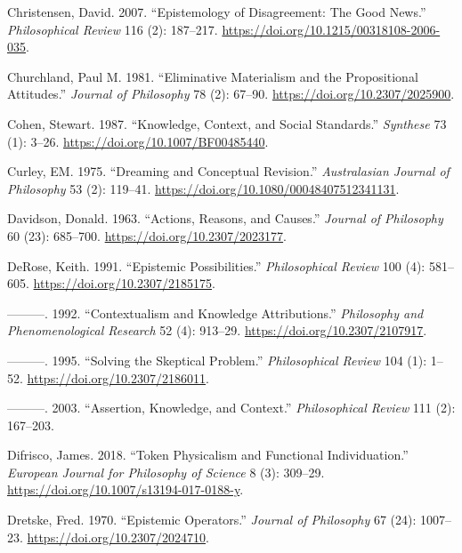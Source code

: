\documentclass[
  12pt,
  letterpaper,
  DIV=11,
  numbers=noendperiod]{scrartcl}
\newlength{\cslhangindent}
\newenvironment{CSLReferences}[2] %
 {\begin{list}{}{%
  \setlength{\itemindent}{0pt}
  \setlength{\leftmargin}{0pt}
  \setlength{\parsep}{0pt}
  \ifodd #1
   \setlength{\leftmargin}{\cslhangindent}
   \setlength{\itemindent}{-1\cslhangindent}
  \fi
  \setlength{\itemsep}{#2\baselineskip}}}
 {\end{list}}
\begin{document}
\begin{CSLReferences}{1}{0}
Christensen, David. 2007. {``Epistemology of Disagreement: The Good
News.''} \emph{Philosophical Review} 116 (2): 187--217.
\url{https://doi.org/10.1215/00318108-2006-035}.

Churchland, Paul M. 1981. {``Eliminative Materialism and the
Propositional Attitudes.''} \emph{Journal of Philosophy} 78 (2): 67--90.
\url{https://doi.org/10.2307/2025900}.

Cohen, Stewart. 1987. {``Knowledge, Context, and Social Standards.''}
\emph{Synthese} 73 (1): 3--26. \url{https://doi.org/10.1007/BF00485440}.

Curley, EM. 1975. {``Dreaming and Conceptual Revision.''}
\emph{Australasian Journal of Philosophy} 53 (2): 119--41.
\url{https://doi.org/10.1080/00048407512341131}.

Davidson, Donald. 1963. {``Actions, Reasons, and Causes.''}
\emph{Journal of Philosophy} 60 (23): 685--700.
\url{https://doi.org/10.2307/2023177}.

DeRose, Keith. 1991. {``Epistemic Possibilities.''} \emph{Philosophical
Review} 100 (4): 581--605. \url{https://doi.org/10.2307/2185175}.

---------. 1992. {``Contextualism and Knowledge Attributions.''}
\emph{Philosophy and Phenomenological Research} 52 (4): 913--29.
\url{https://doi.org/10.2307/2107917}.

---------. 1995. {``Solving the Skeptical Problem.''}
\emph{Philosophical Review} 104 (1): 1--52.
\url{https://doi.org/10.2307/2186011}.

---------. 2003. {``Assertion, Knowledge, and Context.''}
\emph{Philosophical Review} 111 (2): 167--203.

Difrisco, James. 2018. {``Token Physicalism and Functional
Individuation.''} \emph{European Journal for Philosophy of Science} 8
(3): 309--29. \url{https://doi.org/10.1007/s13194-017-0188-y}.

Dretske, Fred. 1970. {``Epistemic Operators.''} \emph{Journal of
Philosophy} 67 (24): 1007--23. \url{https://doi.org/10.2307/2024710}.


\end{CSLReferences}
\end{document}

